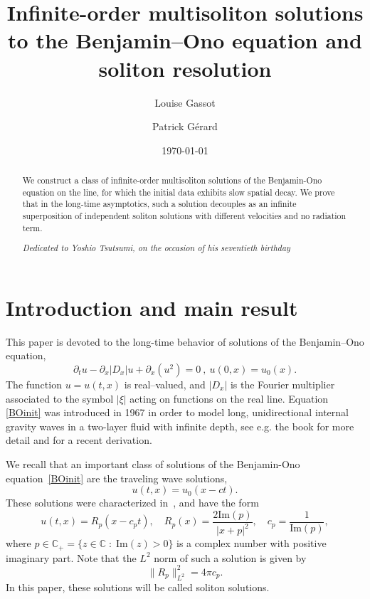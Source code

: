 \documentclass[english, 12pt]{amsart}%
\title[Infinite-order multisolitons for the Benjamin--Ono equation]{Infinite-order multisoliton solutions to the Benjamin--Ono equation and soliton resolution}
\date{\today}
\author[L.~Gassot]{Louise Gassot}
\author[P.~Gérard]{Patrick Gérard}
\newcommand{\C}{\mathbb{C}}
\renewcommand{\Im}{\mathrm{Im}}
\numberwithin{equation}{section}
\begin{document}
\maketitle

\begin{abstract}
We construct a class of infinite-order multisoliton solutions of the Benjamin-Ono equation on the line, for which the initial data exhibits slow spatial decay. We prove that in the long-time asymptotics, such a solution decouples as an infinite superposition of independent soliton solutions with different velocities and no radiation term.
\vskip 0.25cm 
\centerline{\em Dedicated to Yoshio Tsutsumi, on the occasion of his seventieth birthday}
\end{abstract}


\setcounter{tocdepth}{1}
\tableofcontents

\section{Introduction and main result}\label{sec1}

This paper is devoted to the long-time behavior of solutions of the Benjamin--Ono equation,
\begin{equation}\label{BOinit}
\partial_tu-\partial_x|D_x|u+\partial_x(u^2)=0\ ,\ u(0,x)=u_0(x).
\end{equation}
The function $u=u(t,x)$ is real--valued, and $|D_x|$ is the Fourier multiplier associated to the symbol $|\xi |$ acting on functions on the real line. Equation \eqref{BOinit} was introduced in 1967 \cite{Benjamin67} in order to model long, unidirectional internal gravity waves 
in a two-layer fluid with infinite depth, see e.g. the book \cite{KleinS21} for more detail and \cite{Paulsen24} for a recent derivation.

We recall that an important class of  solutions of the Benjamin-Ono equation~\eqref{BOinit} are the traveling wave solutions, 
\[ u(t,x)=u_0(x-ct).\]
These solutions  were characterized in~\cite{AmickToland1991}, and have the form
\begin{equation}\label{eq:Rp}
u(t,x)=R_{p}(x-c_pt),
\quad
R_p(x)=\frac{2 \Im(p)}{|x+p|^2},
\quad
c_p=\frac{1}{\Im(p)},
\end{equation}
where $p\in\C_+=\{z\in\C \;\colon\; \Im(z)>0\}$ is a complex number with positive imaginary part. Note that the $L^2$ norm of such a solution is given by
\[
\|R_p\|_{L^2}^2=4\pi c_p.
\]
In this paper, these solutions will be called soliton solutions.
\end{document}
